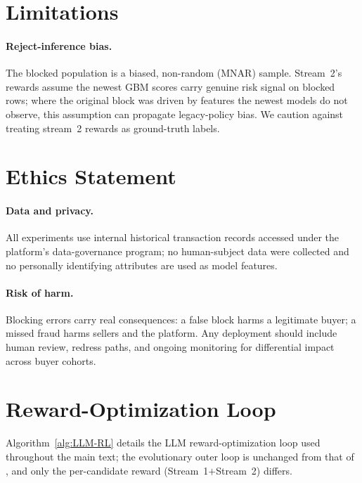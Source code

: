 \documentclass[11pt]{article}
\begin{document}
\section*{Limitations}
\paragraph{Reject-inference bias.} The blocked population is a biased, non-random (MNAR)
sample. Stream~2's rewards assume the newest GBM scores carry genuine risk signal on blocked
rows; where the original block was driven by features the newest models do not observe, this
assumption can propagate legacy-policy bias. We caution against treating stream~2 rewards as
ground-truth labels.

\section*{Ethics Statement}
\paragraph{Data and privacy.} All experiments use internal historical transaction records
accessed under the platform's data-governance program; no human-subject data were
collected and no personally identifying attributes are used as model features.

\paragraph{Risk of harm.} Blocking errors carry real consequences: a false block harms a
legitimate buyer; a missed fraud harms sellers and the platform. Any deployment should include
human review, redress paths, and ongoing monitoring for differential impact across buyer
cohorts.



\appendix
\section{Reward-Optimization Loop}
\label{appendix:alg}
Algorithm~\ref{alg:LLM-RL} details the LLM reward-optimization loop used throughout the main
text; the evolutionary outer loop is unchanged from that of \citet{qu2025llmenhanced}, and only the per-candidate reward (Stream~1$+$Stream~2) differs.
\end{document}
